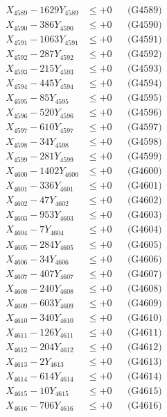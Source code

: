 \documentclass[a4paper,10pt]{article}
\begin{document}
{\begin{align}
X_{4589} - 1629Y_{4589} &\leq +0 && \text{(G4589)} \\
X_{4590} - 386Y_{4590} &\leq +0 && \text{(G4590)} \\
\allowbreak
X_{4591} - 1063Y_{4591} &\leq +0 && \text{(G4591)} \\
X_{4592} - 287Y_{4592} &\leq +0 && \text{(G4592)} \\
X_{4593} - 215Y_{4593} &\leq +0 && \text{(G4593)} \\
X_{4594} - 445Y_{4594} &\leq +0 && \text{(G4594)} \\
X_{4595} - 85Y_{4595} &\leq +0 && \text{(G4595)} \\
X_{4596} - 520Y_{4596} &\leq +0 && \text{(G4596)} \\
X_{4597} - 610Y_{4597} &\leq +0 && \text{(G4597)} \\
X_{4598} - 34Y_{4598} &\leq +0 && \text{(G4598)} \\
X_{4599} - 281Y_{4599} &\leq +0 && \text{(G4599)} \\
X_{4600} - 1402Y_{4600} &\leq +0 && \text{(G4600)} \\
\allowbreak
X_{4601} - 336Y_{4601} &\leq +0 && \text{(G4601)} \\
X_{4602} - 47Y_{4602} &\leq +0 && \text{(G4602)} \\
X_{4603} - 953Y_{4603} &\leq +0 && \text{(G4603)} \\
X_{4604} - 7Y_{4604} &\leq +0 && \text{(G4604)} \\
X_{4605} - 284Y_{4605} &\leq +0 && \text{(G4605)} \\
X_{4606} - 34Y_{4606} &\leq +0 && \text{(G4606)} \\
X_{4607} - 407Y_{4607} &\leq +0 && \text{(G4607)} \\
X_{4608} - 240Y_{4608} &\leq +0 && \text{(G4608)} \\
X_{4609} - 603Y_{4609} &\leq +0 && \text{(G4609)} \\
X_{4610} - 340Y_{4610} &\leq +0 && \text{(G4610)} \\
\allowbreak
X_{4611} - 126Y_{4611} &\leq +0 && \text{(G4611)} \\
X_{4612} - 204Y_{4612} &\leq +0 && \text{(G4612)} \\
X_{4613} - 2Y_{4613} &\leq +0 && \text{(G4613)} \\
X_{4614} - 614Y_{4614} &\leq +0 && \text{(G4614)} \\
X_{4615} - 10Y_{4615} &\leq +0 && \text{(G4615)} \\
X_{4616} - 706Y_{4616} &\leq +0 && \text{(G4616)} \\

\end{align}}
\end{document}
